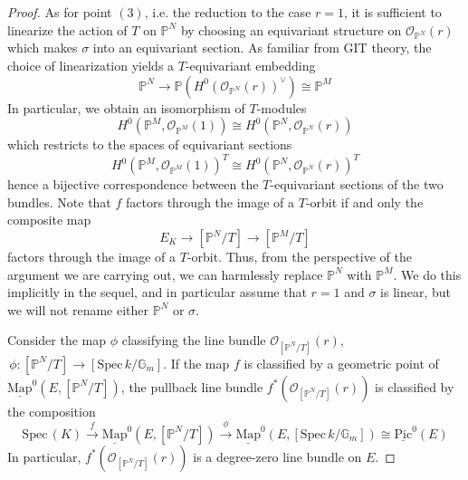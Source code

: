 \documentclass[10pt,a4paper]{amsart}
\newcommand{\Mapo}[2]{\underline{\mathrm{Map}}^{0}\left (#1,#2\right )}
\newcommand{\Pic}{\underline{\mathrm{Pic}}}
\newcommand{\Spec}{\mathrm{S}\mathrm{pec}\,}
\newcommand{\bG}{\mathbb{G}}
\newcommand{\bP}{\mathbb{P}}
\newcommand{\cO}{\mathcal{O}}
\begin{document}
\begin{proof}
As for point $(3)$, i.e. the reduction to the case $r=1$, it is sufficient 
to linearize the action of $T$ on $\bP^N$ by choosing an equivariant structure on $\cO_{\bP^N}(r)$ which makes $\sigma$ into an equivariant section. As familiar from GIT theory, the choice of linearization yields a $T$-equivariant embedding
$$\bP^N \to \bP(H^0(\cO_{\bP^N}(r))^\vee) \cong \bP^M$$ 
In particular, we obtain an isomorphism of $T$-modules
\begin{equation*}
    H^0(\bP^M,\cO_{\bP^M}(1)) \cong H^0(\bP^N,\cO_{\bP^N}(r))
\end{equation*}
which restricts to  the spaces of equivariant sections
\begin{equation*}
    H^0(\bP^M,\cO_{\bP^M}(1))^{T} \cong H^0(\bP^N,\cO_{\bP^N}(r))^{T}
\end{equation*}
hence a bijective correspondence between the $T$-equivariant sections of the two bundles. Note that $f$ factors through the image of a $T$-orbit if and only the composite map
$$
E_K \to [\bP^N/T] \to [\bP^M/T]
$$ 
factors through the image of a $T$-orbit. Thus, from the perspective of the argument we are carrying out, we can harmlessly replace $\bP^N$ with $\bP^M$.  We do this implicitly in the sequel, and in particular assume that $r=1$ and $\sigma$ is linear, but we will not rename either $\bP^N$ or $\sigma$. 



Consider the map $\phi$  classifying the line bundle $\cO_{[\bP^N/T]}(r)$, $\, 
\phi: [\bP^N/T] \to [\Spec k/\bG_m].$   
If the map $f$ is classified by a geometric point  of $\Mapo{E}{[\bP^N/T]}$, the pullback line bundle $f^*(\cO_{[\bP^N/T]}(r))$ is classified by the composition 
$$
\Spec(K) \stackrel{f}\to \Mapo{E}{[\bP^N/T]} \stackrel{\phi}\to \Mapo{E}{[\Spec k/\bG_m]} \cong \Pic^0(E)
$$
In particular, $f^\ast(\cO_{[\bP^N/T]}(r))$ is a degree-zero line bundle on $E$. 


\end{proof}
\end{document}
